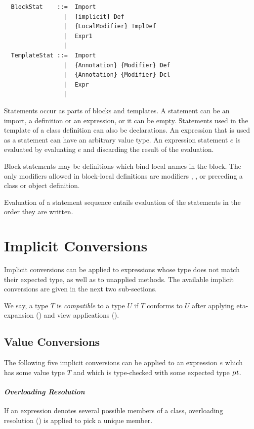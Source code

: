 \syntax\begin{lstlisting}
  BlockStat    ::=  Import
                 |  [implicit] Def
                 |  {LocalModifier} TmplDef
                 |  Expr1
                 | 
  TemplateStat ::=  Import
                 |  {Annotation} {Modifier} Def
                 |  {Annotation} {Modifier} Dcl
                 |  Expr
                 | 
\end{lstlisting}

Statements occur as parts of blocks and templates.  A statement can be
an import, a definition or an expression, or it can be empty.
Statements used in the template of a class definition can also be
declarations.  An expression that is used as a statement can have an
arbitrary value type. An expression statement $e$ is evaluated by
evaluating $e$ and discarding the result of the evaluation. 

Block statements may be definitions which bind local names in the
block. The only modifiers allowed in block-local definitions are modifiers
, , or  preceding a class or
object definition.

Evaluation of a statement sequence entails evaluation of the
statements in the order they are written.

\section{Implicit Conversions}
\label{sec:impl-conv}

Implicit conversions can be applied to expressions whose type does not
match their expected type, as well as to unapplied methods. The
available implicit conversions are given in the next two sub-sections.

We say, a type $T$ is {\em compatible} to a type $U$ if $T$ conforms
to $U$ after applying eta-expansion () and view applications
().

\subsection{Value Conversions}

The following five implicit conversions can be applied to an
expression $e$ which has some value type $T$ and which is type-checked with
some expected type $\mbox{\sl pt}$.

\paragraph{\em Overloading Resolution} 
If an expression denotes several possible members of a class, 
overloading resolution ()
is applied to pick a unique member.

